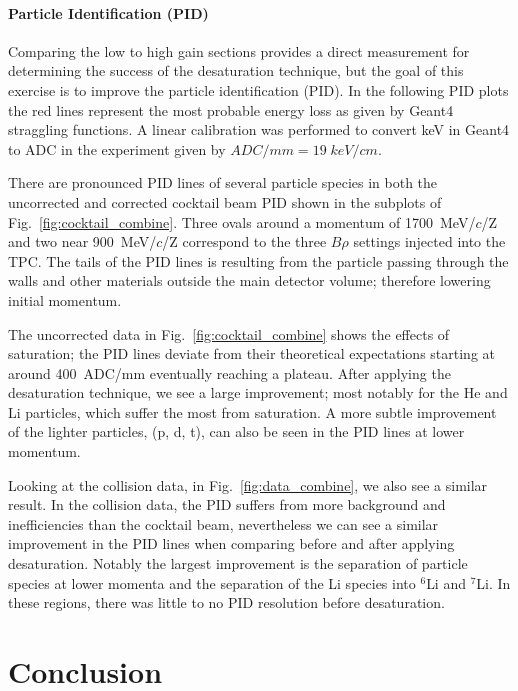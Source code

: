 \documentclass[review]{elsarticle}
\begin{document}
\paragraph{Particle Identification (PID)}


Comparing the low to high gain sections provides a direct measurement for determining the success of the desaturation technique, but the goal  of this exercise is to improve the particle identification (PID). In the following PID plots the red lines represent the most probable energy loss as given by Geant4 straggling functions. A linear calibration was performed to convert keV in Geant4 to ADC in the experiment given by $ADC/mm = 19\;keV/cm$.

There are pronounced PID lines of several particle species in both the uncorrected and corrected cocktail beam PID shown in the subplots of Fig.~\ref{fig:cocktail_combine}. Three ovals around a momentum of 1700~MeV/$c$/Z and two near 900~MeV/$c$/Z correspond to the three $B\rho$ settings injected into the TPC. The tails of the PID lines is resulting from the particle passing through the walls and other materials outside the main detector volume; therefore lowering initial momentum. 

The uncorrected data in Fig.~\ref{fig:cocktail_combine} shows the effects of saturation; the PID lines deviate from their theoretical expectations starting at around 400~ADC/mm eventually reaching a plateau. After applying the desaturation technique, we see a large improvement; most notably for the He and Li particles, which suffer the most from saturation. A more subtle improvement of the lighter particles, (p, d, t), can also be seen in the PID lines at lower momentum.

Looking at the collision data, in Fig.~\ref{fig:data_combine}, we also see a similar result. In the collision data, the PID suffers from more background and inefficiencies than the cocktail beam, nevertheless we can see a similar improvement in the PID lines when comparing before and after applying desaturation. Notably the largest improvement is the separation of particle species at lower momenta and the separation of the Li species into ${}^{6}$Li and ${}^{7}$Li. In these regions, there was little to no PID resolution before desaturation. 

\clearpage

\section{Conclusion}
\end{document}

